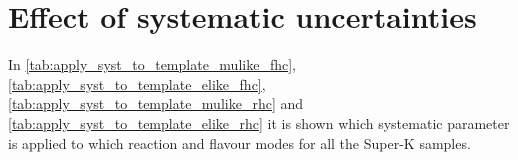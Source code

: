 
%
%

\section{Effect of systematic uncertainties}
\label{app:systematics}

In \cref{tab:apply_syst_to_template_mulike_fhc},
\ref{tab:apply_syst_to_template_elike_fhc},
\ref{tab:apply_syst_to_template_mulike_rhc} and
\ref{tab:apply_syst_to_template_elike_rhc}
it is shown which systematic parameter is applied to which reaction and flavour modes 
for all the Super-K samples.
 
\afterpage{}
\afterpage{}
\afterpage{}
\afterpage{}
\afterpage{}

\clearpage

%
%
%
%
%
%




%

